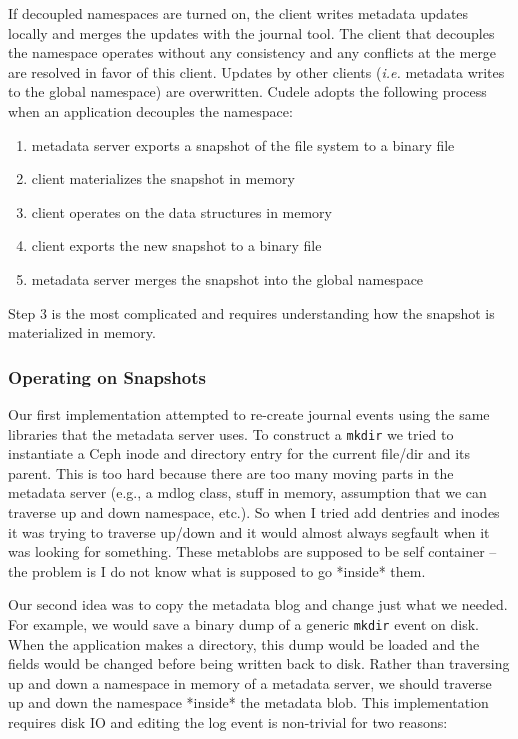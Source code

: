 \documentclass[preprint]{sigplanconf-eurosys}
\begin{document}
If
decoupled namespaces are turned on, the client writes metadata updates locally
and merges the updates with the journal tool. The client that decouples the
namespace operates without any consistency and any conflicts at the merge are
resolved in favor of this client. Updates by other clients ({\it i.e.} metadata
writes to the global namespace) are overwritten. Cudele adopts the following
process when an application decouples the namespace:

\begin{enumerate}
  \item metadata server exports a snapshot of the file system to a binary file
  \item client materializes the snapshot in memory
  \item client operates on the data structures in memory
  \item client exports the new snapshot to a binary file
  \item metadata server merges the snapshot into the global namespace
\end{enumerate}

Step 3 is the most complicated and requires understanding how the snapshot is
materialized in memory. 

\subsubsection{Operating on Snapshots} 

Our first implementation attempted to re-create journal events using the same
libraries that the metadata server uses. To construct a \texttt{mkdir} we tried
to instantiate a Ceph inode and directory entry for the current file/dir and
its parent.  This is too hard because there are too many moving parts in the
metadata server (e.g., a mdlog class, stuff in memory, assumption that we can
traverse up and down namespace, etc.). So when I tried add dentries and inodes
it was trying to traverse up/down and it would almost always segfault when it
was looking for something. These metablobs are supposed to be self container --
the problem is I do not know what is supposed to go *inside* them. 

Our second idea was to copy the metadata blog and change just what we needed.
For example, we would save a binary dump of a generic \texttt{mkdir} event on
disk. When the application makes a directory, this dump would be loaded and the
fields would be changed before being written back to disk. Rather than
traversing up and down a namespace in memory of a metadata server, we should
traverse up and down the namespace *inside* the metadata blob. This
implementation requires disk IO and editing the log event is non-trivial for
two reasons:
\end{document}
